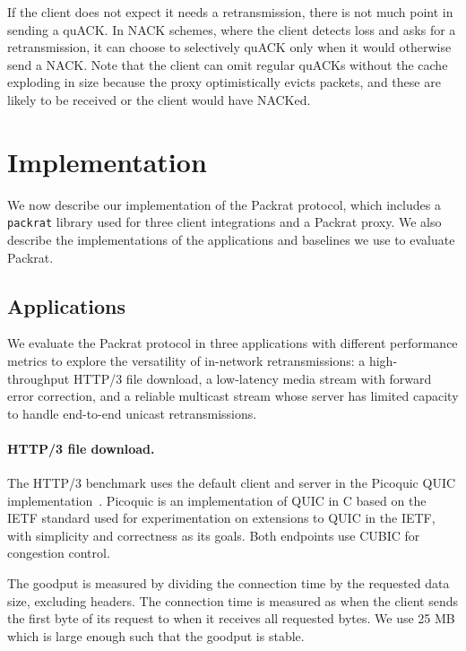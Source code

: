 If the client does not expect it needs a retransmission, there is not much point
in sending a quACK. In NACK schemes, where the client detects loss and asks for
a retransmission, it can choose to selectively quACK only when it would
otherwise send a NACK. Note that the client can omit regular quACKs without the
cache exploding in size because the proxy optimistically evicts packets, and
these are likely to be received or the client would have NACKed.\\

\section{Implementation}
\label{sec:packrat:implementation}

We now describe our implementation of the Packrat protocol, which includes
a \texttt{packrat} library used for three client integrations
and a Packrat proxy. We also describe the implementations of the
applications and baselines we use to evaluate Packrat.

\subsection{Applications}
\label{sec:packrat:implementation:applications}

We evaluate the Packrat protocol in three applications with different performance
metrics to explore the versatility of in-network retransmissions:
a high-throughput HTTP/3 file download, a low-latency media stream with forward
error correction, and a reliable multicast stream whose server has limited
capacity to handle end-to-end unicast retransmissions.

\paragraph{HTTP/3 file download.}

The HTTP/3 benchmark uses the default client and server in the Picoquic QUIC
implementation~\cite{picoquic}. Picoquic is an implementation of QUIC in C
based on the IETF standard used for experimentation on extensions to QUIC in
the IETF, with simplicity and correctness as its goals. Both endpoints use
CUBIC for congestion control.

The goodput is measured by dividing the connection time by the requested data
size, excluding headers.
The connection time is measured as when the client sends the first
byte of its request to when it receives all requested bytes.
We use 25 MB which is large enough such that the goodput is stable.

